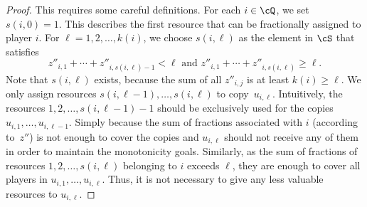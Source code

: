 \documentclass[a4paper,USenglish,cleveref,thm-restate]{lipics-v2021}
\begin{document}
\begin{proof}
    This requires some careful definitions.
    For each $i\in \cQ$, we set
    $s(i,0) = 1$. This describes the first resource that
    can be fractionally assigned to player $i$.
    For $\ell = 1,2,\dotsc,k(i)$,
    we choose $s(i,\ell)$ as the element in $\cS$ that satisfies
    \begin{equation*}
        z''_{i,1} + \cdots + z''_{i,s(i,\ell)-1} < \ell
        \text{ and }
        z''_{i,1} + \cdots + z''_{i,s(i,\ell)} \ge \ell .
    \end{equation*}
    Note that $s(i,\ell)$ exists, because the sum of
    all $z''_{i,j}$ is at least $k(i) \ge \ell$.
    We only assign resources $s(i,\ell-1),\dotsc,s(i,\ell)$ to copy~$u_{i,\ell}$.
    Intuitively, the resources $1,2,\dotsc,s(i,\ell-1)-1$ should be exclusively used for the copies $u_{i,1},\dotsc,u_{i,\ell-1}$. Simply because the sum of fractions associated with $i$ (according to~$z''$) is not enough to cover the copies and $u_{i,\ell}$ should not receive any of them in order to maintain the monotonicity goals.
    Similarly, as the sum of fractions
    of resources $1,2,\dotsc,s(i,\ell)$ belonging to $i$
    exceeds $\ell$, they are enough to cover all players in
    $u_{i,1},\dotsc,u_{i,\ell}$.
    Thus, it is not necessary to give any less valuable resources to 
    $u_{i,\ell}$.


\end{proof}
\end{document}
